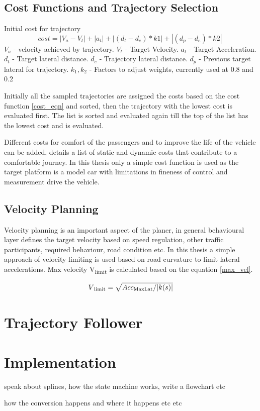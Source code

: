 \subsection{Cost Functions and Trajectory Selection} \label{traj_Selection}

Initial cost for trajectory
\begin{equation}
cost = |V_a - V_t| + |a_t| + | (d_t - d_e)*k1 | + | (d_p - d_e)*k2 |\
\label{cost_eqn}
\end{equation}
$V_a$ - velocity achieved by trajectory.
$V_t$ - Target Velocity.
$a_t$ - Target Acceleration.
$d_t$ - Target lateral distance.
$d_e$ - Trajectory lateral distance.
$d_p$ - Previous target lateral for trajectory.
$k_1,k_2$ - Factors to adjust weights, currently used at 0.8 and 0.2


Initially all the sampled trajectories are assigned the costs based on the cost function \ref{cost_eqn} and sorted, then the trajectory with the lowest cost is evaluated first. The list is sorted and evaluated again till the top of the list has the lowest cost and is evaluated.

Different costs for comfort of the passengers and to improve the life of the vehicle can be added, \cite{traj_planner_optimization} details a list of static and dynamic costs that contribute to a comfortable journey. In this thesis only a simple cost function is used as the target platform is a model car with limitations in fineness of control and measurement drive the vehicle. 

\subsection{Velocity Planning}
Velocity planning is an important aspect of the planer, in general behavioural layer defines the target velocity based on speed regulation, other traffic participants, required behaviour, road condition etc. In this thesis a simple approach of velocity limiting is used based on road curvature to limit lateral accelerations. Max velocity  V\textsubscript{limit} is calculated based on the equation \ref{max_vel}. 

\begin{equation}
    V\textsubscript{limit} = \sqrt{Acc\textsubscript{MaxLat} / |k(s)|}
\label{max_vel}
\end{equation}

\section{Trajectory Follower} \label{traj_follower}


\section{Implementation} \label{implementation}

speak about splines, how the state machine works, write a flowchart etc

how the conversion happens and where it happens etc etc
